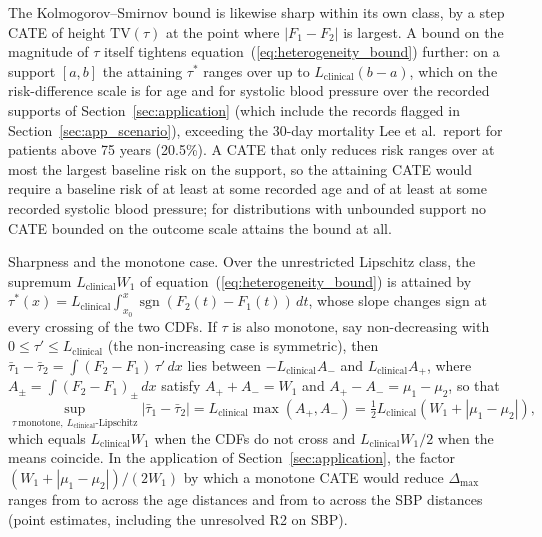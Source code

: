 \documentclass[AMA,Times1COL]{WileyNJDv5}
\begin{document}
The Kolmogorov--Smirnov bound is likewise sharp within its own class, by a step CATE of height $\mathrm{TV}(\tau)$ at the point where $|F_1 - F_2|$ is largest. A bound on the magnitude of $\tau$ itself tightens equation~(\ref{eq:heterogeneity_bound}) further: on a support $[a, b]$ the attaining $\tau^*$ ranges over up to $L_{\text{clinical}} (b - a)$, which on the risk-difference scale is  for age and  for systolic blood pressure over the recorded supports of Section~\ref{sec:application} (which include the records flagged in Section~\ref{sec:app_scenario}), exceeding the 30-day mortality Lee et al.\ report for patients above 75 years (20.5\%).\cite{lee1995} A CATE that only reduces risk ranges over at most the largest baseline risk on the support, so the attaining CATE would require a baseline risk of at least  at some recorded age and of at least  at some recorded systolic blood pressure; for distributions with unbounded support no CATE bounded on the outcome scale attains the bound at all.

Sharpness and the monotone case. Over the unrestricted Lipschitz class, the supremum $L_{\text{clinical}} W_1$ of equation~(\ref{eq:heterogeneity_bound}) is attained by $\tau^*(x) = L_{\text{clinical}} \int_{x_0}^{x} \operatorname{sgn}(F_2(t) - F_1(t))\,dt$, whose slope changes sign at every crossing of the two CDFs. If $\tau$ is also monotone, say non-decreasing with $0 \leq \tau' \leq L_{\text{clinical}}$ (the non-increasing case is symmetric), then $\bar{\tau}_1 - \bar{\tau}_2 = \int (F_2 - F_1)\,\tau'\,dx$ lies between $-L_{\text{clinical}} A_-$ and $L_{\text{clinical}} A_+$, where $A_\pm = \int (F_2 - F_1)_\pm\,dx$ satisfy $A_+ + A_- = W_1$ and $A_+ - A_- = \mu_1 - \mu_2$, so that
\begin{equation}
\sup_{\tau\ \text{monotone},\ L_{\text{clinical}}\text{-Lipschitz}} |\bar{\tau}_1 - \bar{\tau}_2| = L_{\text{clinical}} \max(A_+, A_-) = \tfrac{1}{2} L_{\text{clinical}} \left( W_1 + |\mu_1 - \mu_2| \right),
\label{eq:mono_bound}
\end{equation}
which equals $L_{\text{clinical}} W_1$ when the CDFs do not cross and $L_{\text{clinical}} W_1 / 2$ when the means coincide. In the application of Section~\ref{sec:application}, the factor $(W_1 + |\mu_1 - \mu_2|)/(2 W_1)$ by which a monotone CATE would reduce $\Delta_{\max}$ ranges from  to  across the age distances and from  to  across the SBP distances (point estimates, including the unresolved R2 on SBP).
\end{document}

